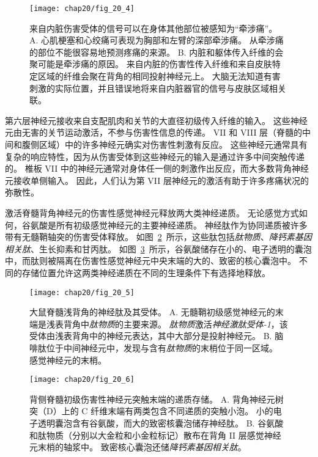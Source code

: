 \begin{figure}[htbp]
	\centering
	\texttt{[image: chap20/fig\_20\_4]}
	\caption{来自内脏伤害受体的信号可以在身体其他部位被感知为“牵涉痛”。
		A. 心肌梗塞和心绞痛可表现为胸部和左臂的深部牵涉痛。
		从牵涉痛的部位不能很容易地预测疼痛的来源。
		B. 内脏和躯体传入纤维的会聚可能是牵涉痛的原因。
		来自内脏的伤害性传入纤维和来自皮肤特定区域的纤维会聚在背角的相同投射神经元上。
		大脑无法知道有害刺激的实际位置，并且错误地将来自内脏器官的信号与皮肤区域相关联\cite{fields1987painful}。}
	\label{fig:20_4}
\end{figure}


第六层神经元接收来自支配肌肉和关节的大直径初级传入纤维的输入。
这些神经元由无害的关节运动激活，不参与伤害性信息的传递。
VII 和 VIII 层（脊髓的中间和腹侧区域）中的许多神经元确实对伤害性刺激有反应。
这些神经元通常具有复杂的响应特性，因为从伤害受体到这些神经元的输入是通过许多中间突触传递的。
椎板 VII 中的神经元通常对身体任一侧的刺激作出反应，而大多数背角神经元接收单侧输入。
因此，人们认为第 VII 层神经元的激活有助于许多疼痛状况的弥散性。


激活脊髓背角神经元的伤害性感觉神经元释放两大类神经递质。
无论感觉方式如何，谷氨酸是所有初级感觉神经元的主要神经递质。
神经肽作为协同递质被许多带有无髓鞘轴突的伤害受体释放。
如图~\ref{fig:20_5}~所示，这些肽包括\textit{肽物质}、\textit{降钙素基因相关肽}、生长抑素和甘丙肽。
如图~\ref{fig:20_6}~所示，谷氨酸储存在小的、电子透明的囊泡中，而肽则被隔离在伤害性感觉神经元中央末端的大的、致密的核心囊泡中。
不同的存储位置允许这两类神经递质在不同的生理条件下有选择地释放。


\begin{figure}[htbp]
	\centering
	\texttt{[image: chap20/fig\_20\_5]}
	\caption{大鼠脊髓浅背角的神经肽及其受体。
		A. 无髓鞘初级感觉神经元的末端是浅表背角中\textit{肽物质}的主要来源。
		\textit{肽物质}激活\textit{神经激肽受体-1}，该受体由浅表背角中的神经元表达，其中大部分是投射神经元。
		B. 脑啡肽位于中间神经元中，发现与含有\textit{肽物质}的末梢位于同一区域。
		感觉神经元的末梢。}
	\label{fig:20_5}
\end{figure}


\begin{figure}[htbp]
	\centering
	\texttt{[image: chap20/fig\_20\_6]}
	\caption{背侧脊髓初级伤害性神经元突触末端的递质存储。
		A. 背角神经元树突（D）上的 C 纤维末端有两类包含不同递质的突触小泡。
		小的电子透明囊泡含有谷氨酸，而大的致密核囊泡储存神经肽。
		B. 谷氨酸和肽物质（分别以大金粒和小金粒标记）散布在背角 II 层感觉神经元末梢的轴浆中。
		致密核心囊泡还储\textit{降钙素基因相关肽}\cite{de1990ultrastructural}。}
	\label{fig:20_6}
\end{figure}


